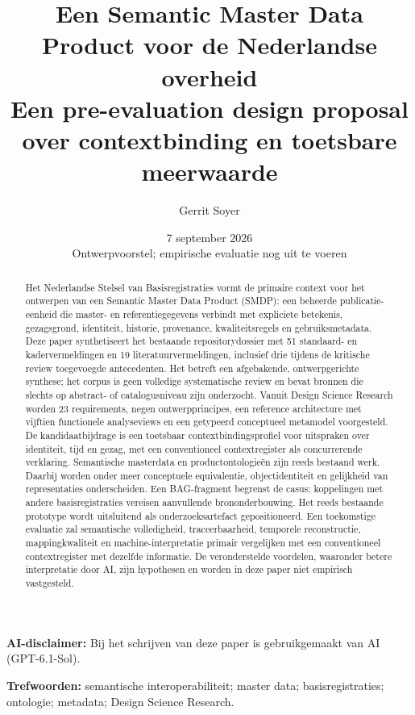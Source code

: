 \documentclass[11pt,a4paper]{article}
\title{Een Semantic Master Data Product voor de Nederlandse overheid\\\large Een pre-evaluation design proposal over contextbinding en toetsbare meerwaarde}
\author{Gerrit Soyer}
\date{7 september 2026\\\small Ontwerpvoorstel; empirische evaluatie nog uit te voeren}
\begin{document}
\maketitle
\noindent\textbf{AI-disclaimer:} Bij het schrijven van deze paper is gebruikgemaakt van AI (GPT-6.1-Sol).
\par\medskip
\begin{abstract}
Het Nederlandse Stelsel van Basisregistraties vormt de primaire context voor het ontwerpen van een Semantic Master Data Product (SMDP): een beheerde publicatie-eenheid die master- en referentiegegevens verbindt met expliciete betekenis, gezagsgrond, identiteit, historie, provenance, kwaliteitsregels en gebruiksmetadata. Deze paper synthetiseert het bestaande repositorydossier met 51 standaard- en kadervermeldingen en 19 literatuurvermeldingen, inclusief drie tijdens de kritische review toegevoegde antecedenten. Het betreft een afgebakende, ontwerpgerichte synthese; het corpus is geen volledige systematische review en bevat bronnen die slechts op abstract- of catalogusniveau zijn onderzocht. Vanuit Design Science Research worden 23 requirements, negen ontwerpprincipes, een reference architecture met vijftien functionele analyseviews en een getypeerd conceptueel metamodel voorgesteld. De kandidaatbijdrage is een toetsbaar contextbindingsprofiel voor uitspraken over identiteit, tijd en gezag, met een conventioneel contextregister als concurrerende verklaring. Semantische masterdata en productontologieën zijn reeds bestaand werk. Daarbij worden onder meer conceptuele equivalentie, objectidentiteit en gelijkheid van representaties onderscheiden. Een BAG-fragment begrenst de casus; koppelingen met andere basisregistraties vereisen aanvullende brononderbouwing. Het reeds bestaande prototype wordt uitsluitend als onderzoeksartefact gepositioneerd. Een toekomstige evaluatie zal semantische volledigheid, traceerbaarheid, temporele reconstructie, mappingkwaliteit en machine-interpretatie primair vergelijken met een conventioneel contextregister met dezelfde informatie. De veronderstelde voordelen, waaronder betere interpretatie door AI, zijn hypothesen en worden in deze paper niet empirisch vastgesteld.
\end{abstract}
\noindent\textbf{Trefwoorden:} semantische interoperabiliteit; master data; basisregistraties; ontologie; metadata; Design Science Research.
\tableofcontents
\newpage








\appendix
\end{document}
